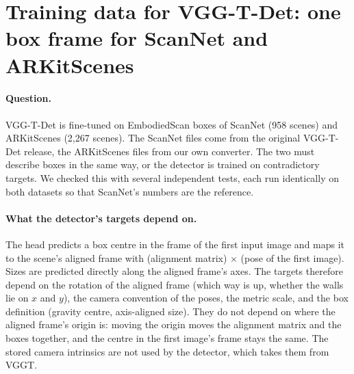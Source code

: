 
\section{Training data for VGG-T-Det: one box frame for ScanNet and ARKitScenes}
\label{sec:vggtdet-data}

\paragraph{Question.}
VGG-T-Det is fine-tuned on EmbodiedScan boxes of ScanNet (958 scenes) and ARKitScenes (2,267 scenes). The
ScanNet files come from the original VGG-T-Det release, the ARKitScenes files from our own converter. The two
must describe boxes in the same way, or the detector is trained on contradictory targets. We checked this with
several independent tests, each run identically on both datasets so that ScanNet's numbers are the reference.

\paragraph{What the detector's targets depend on.}
The head predicts a box centre in the frame of the first input image and maps it to the scene's aligned frame
with (alignment matrix) $\times$ (pose of the first image). Sizes are predicted directly along the aligned
frame's axes. The targets therefore depend on the rotation of the aligned frame (which way is up, whether the
walls lie on $x$ and $y$), the camera convention of the poses, the metric scale, and the box definition
(gravity centre, axis-aligned size). They do not depend on where the aligned frame's origin is: moving the
origin moves the alignment matrix and the boxes together, and the centre in the first image's frame stays the
same. The stored camera intrinsics are not used by the detector, which takes them from VGGT.

